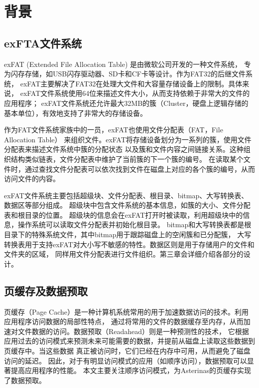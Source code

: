 
\chapter{背景}
\section{exFTA文件系统}
exFAT (Extended File Allocation Table)\parencite{exFAT} 是由微软公司开发的一种文件系统，
专为闪存存储，如USB闪存驱动器、SD卡和CF卡等设计。作为FAT32的后继文件系统，
exFAT主要解决了FAT32在处理大文件和大容量存储设备上的限制。具体来说，
exFAT文件系统使用64位来描述文件大小，从而支持依赖于非常大的文件的应用程序；
exFAT文件系统还允许最大32MB的簇（Cluster，硬盘上逻辑存储的基本单位），有效地支持了非常大的存储设备。

作为FAT文件系统家族中的一员，exFAT也使用文件分配表（FAT，File Allocation Table）
来组织文件。exFAT将存储设备划分为一系列的簇，使用文件分配表来描述文件系统中簇的分配状态
以及簇和文件内容之间链接关系。这种组织结构类似链表，文件分配表中维护了当前簇的下一个簇的编号。
在读取某个文件时，通过查找文件分配表可以依次找到文件在磁盘上对应的各个簇的编号，从而访问文件的内容。

exFAT文件系统主要包括超级块、文件分配表、根目录、bitmap、大写转换表、数据区等部分组成。
超级块中包含文件系统的基本信息，如簇的大小、文件分配表和根目录的位置。
超级块的信息会在exFAT打开时被读取，利用超级块中的信息，操作系统可以读取文件分配表并初始化根目录。
bitmap和大写转换表都是根目录下的特殊系统文件，其中bitmap用于跟踪磁盘上的空闲簇和已分配簇，
大写转换表用于支持exFAT对大小写不敏感的特性。数据区则是用于存储用户的文件和文件夹的区域，
同样用文件分配表进行文件组织。第三章会详细介绍各部分的设计。

\section{页缓存及数据预取}
页缓存（Page Cache）是一种计算机系统常用的用于加速数据访问的技术。利用应用程序访问数据的局部性特点，
通过将常用的文件的数据缓存至内存，从而加速对文件数据的访问。数据预取（Readahead）则是一种预测性的技术，
它根据应用过去的访问模式来预测未来可能需要的数据，并提前从磁盘上读取这些数据到页缓存中。当这些数据
真正被访问时，它们已经在内存中可用，从而避免了磁盘访问的延迟。
因此，对于有明显访问模式的应用（如顺序访问），数据预取可以显著提高应用程序的性能。
本文主要关注顺序访问模式，为Asterinas的页缓存实现了数据预取。

